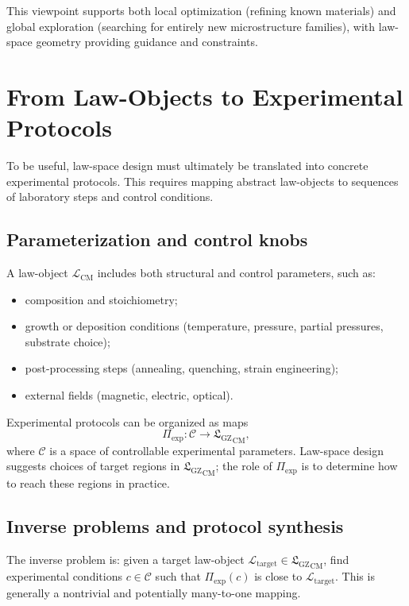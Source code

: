 \documentclass[11pt]{book}
\newcommand{\GZLS}{\ensuremath{\mathfrak{L}_{\mathrm{GZ}}}}
\theoremstyle{plain}
\theoremstyle{definition}
\theoremstyle{remark}
\begin{document}
This viewpoint supports both local optimization (refining known
materials) and global exploration (searching for entirely new
microstructure families), with law-space geometry providing guidance
and constraints.

\section{From Law-Objects to Experimental Protocols}
\label{sec:lawobjects-to-experimental-protocols}


To be useful, law-space design must ultimately be translated into
concrete experimental protocols. This requires mapping abstract
law-objects to sequences of laboratory steps and control conditions.

\subsection*{Parameterization and control knobs}

A law-object $\mathcal{L}_{\mathrm{CM}}$ includes both structural
and control parameters, such as:
\begin{itemize}
  \item composition and stoichiometry;
  \item growth or deposition conditions (temperature, pressure,
        partial pressures, \\substrate choice);
  \item post-processing steps (annealing, quenching, strain
        engineering);
  \item external fields (magnetic, electric, optical).
\end{itemize}

Experimental protocols can be organized as maps
\[
   \Pi_{\mathrm{exp}} \colon \mathcal{C}
   \longrightarrow {\GZLS}_{\mathrm{CM}},
\]
where $\mathcal{C}$ is a space of controllable experimental
parameters. Law-space design suggests choices of target regions in
${\GZLS}_{\mathrm{CM}}$; the role of $\Pi_{\mathrm{exp}}$ is to
determine how to reach these regions in practice.

\subsection*{Inverse problems and protocol synthesis}

The inverse problem is: given a target law-object
$\mathcal{L}_{\mathrm{target}} \in {\GZLS}_{\mathrm{CM}}$, find
experimental conditions $c \in \mathcal{C}$ such that
$\Pi_{\mathrm{exp}}(c)$ is close to $\mathcal{L}_{\mathrm{target}}$.
This is generally a nontrivial and potentially many-to-one mapping.
\end{document}
